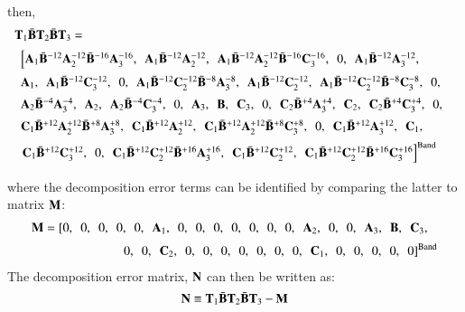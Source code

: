 \documentclass{warpdoc}
\newcommand{\alb}{\vspace{0.2cm}\\} %
\newcommand{\M}{{\bf M}}
\newcommand{\N}{{\bf N}}
\newcommand{\B}{{\bf B}}
\newcommand{\BI}{\wbar{{\bf B}}}
\newcommand{\A}{{\bf A}}
\newcommand{\C}{{\bf C}}
\newcommand{\T}{{\bf T}}
\newcommand{\co}{,~~}
\newcommand{\band}{{\rm Band}}
\begin{document}
%
then,
%
\begin{displaymath}
\begin{array}{l}
\T_1 \BI \T_2 \BI \T_3=  \alb
  \begin{array}{l}
   \left[
   \A_1 \BI^{-12}\A_2^{-12} \BI^{-16} \A_3^{-16}\co
   \A_1 \BI^{-12}\A_2^{-12}\co
   \A_1 \BI^{-12}\A_2^{-12} \BI^{-16} \C_3^{-16}\co
   0\co
   \A_1 \BI^{-12} \A_3^{-12}\co \right. \alb
   \A_1\co
   \A_1 \BI^{-12} \C_3^{-12}\co
   0\co
   \A_1 \BI^{-12}\C_2^{-12} \BI^{-8} \A_3^{-8}\co
   \A_1 \BI^{-12}\C_2^{-12}\co
   \A_1 \BI^{-12}\C_2^{-12} \BI^{-8} \C_3^{-8}\co
   0\co \alb
   \A_2 \BI^{-4} \A_3^{-4}\co
   \A_2\co
   \A_2 \BI^{-4} \C_3^{-4}\co
   0\co
   \A_3\co
   \B\co
   \C_3\co
   0\co
   \C_2 \BI^{+4} \A_3^{+4}\co
   \C_2\co
   \C_2 \BI^{+4} \C_3^{+4}\co
   0\co\alb


   \C_1 \BI^{+12}\A_2^{+12} \BI^{+8} \A_3^{+8}\co
   \C_1 \BI^{+12}\A_2^{+12}\co
   \C_1 \BI^{+12}\A_2^{+12} \BI^{+8} \C_3^{+8}\co
   0\co
   \C_1 \BI^{+12} \A_3^{+12}\co
   \C_1\co\alb
   \left.
   \C_1 \BI^{+12} \C_3^{+12}\co
   0\co
   \C_1 \BI^{+12}\C_2^{+12} \BI^{+16} \A_3^{+16}\co
   \C_1 \BI^{+12}\C_2^{+12}\co
   \C_1 \BI^{+12}\C_2^{+12} \BI^{+16} \C_3^{+16}
   \right]^\band\alb
  \end{array}
\end{array}
\end{displaymath}
%
where the decomposition error terms can be identified by comparing the latter
to matrix $\M$:
%
\begin{displaymath}
  \begin{array}{r}
  \M=
   \left[ 0\co
   0\co
   0\co
   0\co
   0\co
   \A_1\co
   0\co
   0\co
   0\co
   0\co
   0\co
   0\co
   0\co
   \A_2\co
   0\co
   0\co
   \A_3\co
   \B\co
   \C_3\co \right. \alb
   \left.
   0\co
   0\co
   \C_2\co
   0\co
   0\co
   0\co
   0\co
   0\co
   0\co
   0\co
   \C_1\co
   0\co
   0\co
   0\co
   0\co
   0 \right]^\band
  \end{array}
\end{displaymath}
%
The decomposition error matrix, $\N$ can then be written as:
%
\begin{equation}
  \N\equiv \T_1 \BI \T_2 \BI \T_3- \M
\end{equation}
%
\end{document}
